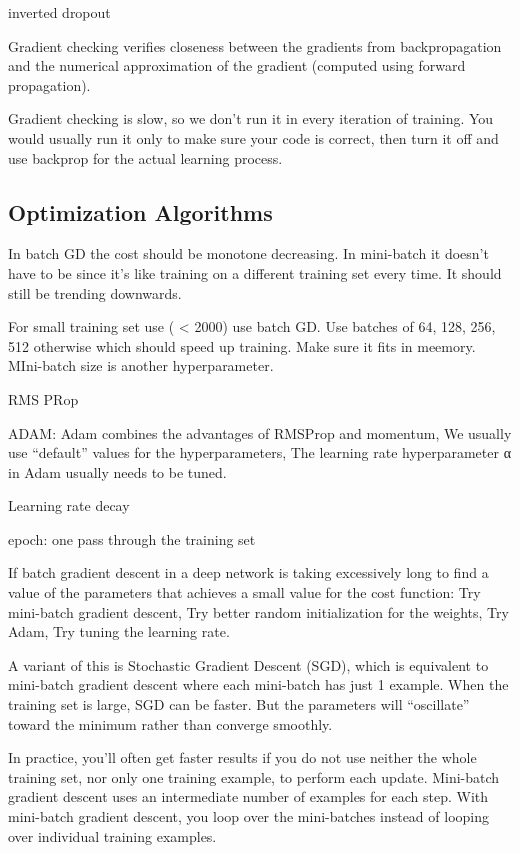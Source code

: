 \documentclass[]{book}
\begin{document}
inverted dropout

Gradient checking verifies closeness between the gradients from
backpropagation and the numerical approximation of the gradient
(computed using forward propagation).

Gradient checking is slow, so we don't run it in every iteration of
training. You would usually run it only to make sure your code is
correct, then turn it off and use backprop for the actual learning
process.

\subsection{Optimization Algorithms}\label{optimization-algorithms}

In batch GD the cost should be monotone decreasing. In mini-batch it
doesn't have to be since it's like training on a different training set
every time. It should still be trending downwards.

For small training set use ( \textless{} 2000) use batch GD. Use batches
of 64, 128, 256, 512 otherwise which should speed up training. Make sure
it fits in meemory. MIni-batch size is another hyperparameter.

RMS PRop

ADAM: Adam combines the advantages of RMSProp and momentum, We usually
use ``default'' values for the hyperparameters, The learning rate
hyperparameter α in Adam usually needs to be tuned.

Learning rate decay

epoch: one pass through the training set

If batch gradient descent in a deep network is taking excessively long
to find a value of the parameters that achieves a small value for the
cost function: Try mini-batch gradient descent, Try better random
initialization for the weights, Try Adam, Try tuning the learning rate.

A variant of this is Stochastic Gradient Descent (SGD), which is
equivalent to mini-batch gradient descent where each mini-batch has just
1 example. When the training set is large, SGD can be faster. But the
parameters will ``oscillate'' toward the minimum rather than converge
smoothly.

In practice, you'll often get faster results if you do not use neither
the whole training set, nor only one training example, to perform each
update. Mini-batch gradient descent uses an intermediate number of
examples for each step. With mini-batch gradient descent, you loop over
the mini-batches instead of looping over individual training examples.
\end{document}
